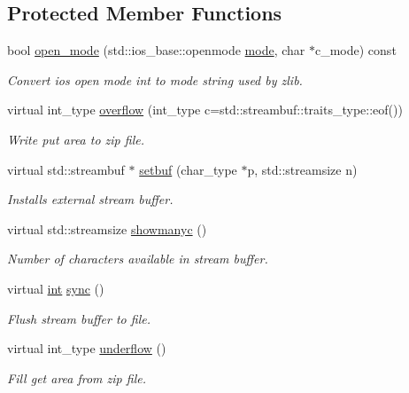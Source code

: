 \subsection*{Protected Member Functions}
\begin{DoxyCompactItemize}
\item 
bool \hyperlink{classzipfilebuf_ad1dc142298bab5d64fdd16000ce206fe}{open\+\_\+mode} (std\+::ios\+\_\+base\+::openmode \hyperlink{ioapi_8h_ab77191763734fbb3e515371393ccb606}{mode}, char $\ast$c\+\_\+mode) const
\begin{DoxyCompactList}\small\item\em Convert ios open mode int to mode string used by zlib. \end{DoxyCompactList}\item 
virtual int\+\_\+type \hyperlink{classzipfilebuf_a7b8c8c309d1c1175a62a37e1b3e8820c}{overflow} (int\+\_\+type c=std\+::streambuf\+::traits\+\_\+type\+::eof())
\begin{DoxyCompactList}\small\item\em Write put area to zip file. \end{DoxyCompactList}\item 
virtual std\+::streambuf $\ast$ \hyperlink{classzipfilebuf_a3b9b3c269535ed0d792c12c42506ccd4}{setbuf} (char\+\_\+type $\ast$p, std\+::streamsize n)
\begin{DoxyCompactList}\small\item\em Installs external stream buffer. \end{DoxyCompactList}\item 
virtual std\+::streamsize \hyperlink{classzipfilebuf_ae3700c160ef70e63b08482a91b222ce1}{showmanyc} ()
\begin{DoxyCompactList}\small\item\em Number of characters available in stream buffer. \end{DoxyCompactList}\item 
virtual \hyperlink{lp__lib_8h_adeb9ec6400320e4923ac9d836d509ddb}{int} \hyperlink{classzipfilebuf_a9db1a908810f7eee6dab4351c2c6924c}{sync} ()
\begin{DoxyCompactList}\small\item\em Flush stream buffer to file. \end{DoxyCompactList}\item 
virtual int\+\_\+type \hyperlink{classzipfilebuf_a6ac8465585d86e24c76fb43d3b8ace99}{underflow} ()
\begin{DoxyCompactList}\small\item\em Fill get area from zip file. \end{DoxyCompactList}\end{DoxyCompactItemize}


